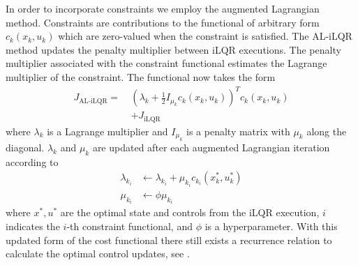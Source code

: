 \documentclass[
  amsfonts,
  amsmath,
  tbtags,
  amssymb,
  aps,
  nobibnotes,
  twocolumn,
]{revtex4-2}
\begin{document}
In order to incorporate constraints we employ
the augmented Lagrangian method. Constraints are contributions
to the functional of arbitrary form $c_{k}(x_{k}, u_{k})$ which are
zero-valued when the constraint is satisfied. The AL-iLQR
method updates the penalty multiplier between
iLQR executions. The penalty multiplier associated with the
constraint functional estimates the Lagrange multiplier of
the constraint. The functional now takes the form
\begin{equation}
  \begin{aligned}
    J_{\textrm{AL-iLQR}} = \ &(\lambda_{k} + \frac{1}{2}I_{\mu_{k}} c_{k}(x_{k}, u_{k}))^{T} c_{k}(x_{k}, u_{k})\\
    &+ J_{\textrm{iLQR}}
  \end{aligned}
\end{equation}
where $\lambda_{k}$ is a Lagrange multiplier and $I_{\mu_{k}}$ is a penalty matrix
with $\mu_{k}$ along the diagonal.
$\lambda_{k}$ and $\mu_{k}$ are updated after each augmented Lagrangian iteration according to
\begin{align}
  \lambda_{k_{i}} &\gets \lambda_{k_{i}} + \mu_{k_{i}} c_{k_{i}}(x_{k}^{*}, u_{k}^{*})\\
  \mu_{k_{i}} &\gets \phi \mu_{k_{i}}
\end{align}
where $x^{*}, u^{*}$ are the optimal state and controls from the iLQR execution,
$i$ indicates the $i$-th constraint functional,
and $\phi$ is a hyperparameter. With this updated form of the cost
functional there still exists a recurrence relation to calculate the optimal control
updates, see \cite{howell2019altro}.
\end{document}
